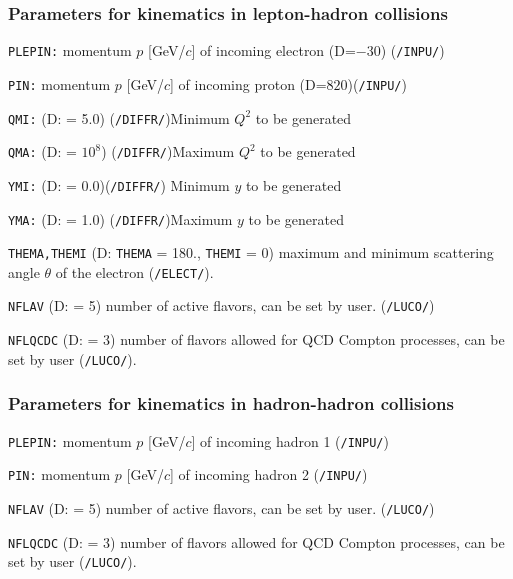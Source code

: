 \documentclass[10pt]{article} \usepackage{dina4}
\newcommand{\deflab}[1]{#1\hfil}%
\newenvironment{defl}[1]%
  {\begin{list}{}{\settowidth{\labelwidth}{#1}%
  \setlength{\leftmargin}{\labelwidth}%
  \addtolength{\leftmargin}{\labelsep}%
  \setlength{\itemsep}{0pt plus 1pt}
  \setlength{\parsep}{0pt plus 1pt}
  \setlength{\topsep}{0pt plus 1pt}
  \setlength{\partopsep}{0pt plus 1pt}
  \setlength{\parskip}{2mm plus 1mm minus 1mm}
  \let\makelabel\deflab}}%
  {\end{list}}
\begin{document}
\subsubsection{Parameters for kinematics in lepton-hadron collisions}
\begin{defl}{123456789012345}
\item[{\tt PLEPIN:}]
                        momentum $p$ [GeV/$c$]
                        of incoming electron (D=$-30$) (\verb+/INPU/+)
\item[{\tt PIN:}]
                        momentum $p$ [GeV/$c$]
                        of incoming proton (D=$820$)(\verb+/INPU/+)
\item[{\tt QMI:}] 
       (D: = 5.0) (\verb+/DIFFR/+)Minimum $Q^2$ to be generated 
\item[{\tt QMA:}]
 (D: = $10^8$) (\verb+/DIFFR/+)Maximum $Q^2$ to be generated
\item[{\tt YMI:}] 
(D: = 0.0)(\verb+/DIFFR/+) Minimum $y$ to be generated
\item[{\tt YMA:}]  
(D: = 1.0) (\verb+/DIFFR/+)Maximum $y$ to be generated
\item[{\tt THEMA,THEMI}]
  (D: \verb+THEMA+ = 180., \verb+THEMI+ = 0)
                    maximum and minimum scattering angle $\theta$ of the 
                    electron (\verb+/ELECT/+).
\item[{\tt NFLAV}] 
(D: = 5) number of active flavors, can be set by user.
                    (\verb+/LUCO/+)
\item[{\tt NFLQCDC}] 
(D: = 3) number of flavors allowed for 
QCD Compton processes, can be set by user (\verb+/LUCO/+).


\end{defl}
\subsubsection{Parameters for kinematics in hadron-hadron collisions}
\begin{defl}{123456789012345}
\item[{\tt PLEPIN:}]
                        momentum $p$ [GeV/$c$]
                        of incoming hadron 1  (\verb+/INPU/+)
\item[{\tt PIN:}]
                        momentum $p$ [GeV/$c$]
                        of incoming hadron 2 (\verb+/INPU/+)
\item[{\tt NFLAV}] 
(D: = 5) number of active flavors, can be set by user.
                    (\verb+/LUCO/+)
\item[{\tt NFLQCDC}] 
(D: = 3) number of flavors allowed for 
QCD Compton processes, can be set by user (\verb+/LUCO/+).


\end{defl}
\end{document}
